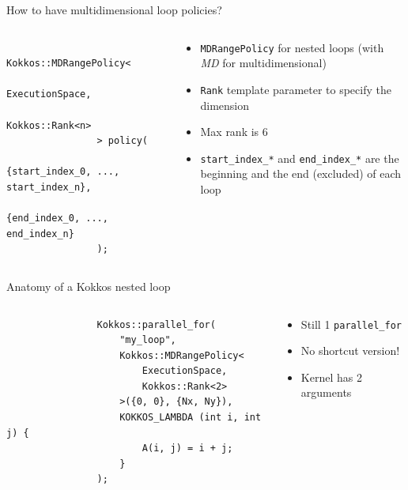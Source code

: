 \documentclass[
    aspectratio=169,
    handout,
]{beamer}
\begin{document}
\begin{frame}[fragile]{How to have multidimensional loop policies?}
    \begin{columns}
        \begin{column}{0.6\linewidth}
            \begin{verbatim}
                Kokkos::MDRangePolicy<
                    ExecutionSpace,
                    Kokkos::Rank<n>
                > policy(
                    {start_index_0, ..., start_index_n},
                    {end_index_0, ..., end_index_n}
                );
            \end{verbatim}
        \end{column}
        \begin{column}{0.4\linewidth}
            \begin{itemize}
                \item \texttt{MDRangePolicy} for nested loops (with \emph{MD} for multidimensional)
                \item \texttt{Rank} template parameter to specify the dimension
                \item Max rank is 6
                \item \texttt{start\_index\_*} and \texttt{end\_index\_*} are the beginning and the end (excluded) of each loop
            \end{itemize}
        \end{column}
    \end{columns}
\end{frame}


\begin{frame}[fragile]{Anatomy of a Kokkos nested loop}
    \begin{columns}
        \begin{column}{0.6\linewidth}
            \begin{verbatim}
                Kokkos::parallel_for(
                    "my_loop",
                    Kokkos::MDRangePolicy<
                        ExecutionSpace,
                        Kokkos::Rank<2>
                    >({0, 0}, {Nx, Ny}),
                    KOKKOS_LAMBDA (int i, int j) {
                        A(i, j) = i + j;
                    }
                );
            \end{verbatim}
        \end{column}
        \begin{column}{0.4\linewidth}
            \begin{itemize}
                \item Still 1 \texttt{parallel\_for}
                \item No shortcut version!
                \item Kernel has 2 arguments
            \end{itemize}
        \end{column}
    \end{columns}
\end{frame}
\end{document}

